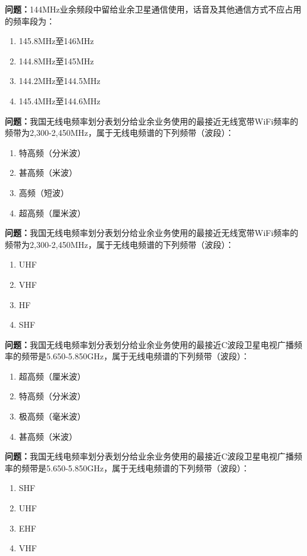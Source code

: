 \bigskip


\noindent\textbf{问题：}144MHz业余频段中留给业余卫星通信使用，话音及其他通信方式不应占用的频率段为：
\begin{enumerate}[label=\Alph*), leftmargin=3em]
\item 145.8MHz至146MHz
\item 144.8MHz至145MHz
\item 144.2MHz至144.5MHz
\item 145.4MHz至144.6MHz
\end{enumerate}

\bigskip


\noindent\textbf{问题：}我国无线电频率划分表划分给业余业务使用的最接近无线宽带WiFi频率的频带为2,300-2,450MHz，属于无线电频谱的下列频带（波段）：
\begin{enumerate}[label=\Alph*), leftmargin=3em]
\item 特高频（分米波）
\item 甚高频（米波）
\item 高频（短波）
\item 超高频（厘米波）
\end{enumerate}

\bigskip


\noindent\textbf{问题：}我国无线电频率划分表划分给业余业务使用的最接近无线宽带WiFi频率的频带为2,300-2,450MHz，属于无线电频谱的下列频带（波段）：
\begin{enumerate}[label=\Alph*), leftmargin=3em]
\item UHF
\item VHF
\item HF
\item SHF
\end{enumerate}

\bigskip


\noindent\textbf{问题：}我国无线电频率划分表划分给业余业务使用的最接近C波段卫星电视广播频率的频带是5.650-5.850GHz，属于无线电频谱的下列频带（波段）：
\begin{enumerate}[label=\Alph*), leftmargin=3em]
\item 超高频（厘米波）
\item 特高频（分米波）
\item 极高频（毫米波）
\item 甚高频（米波）
\end{enumerate}

\bigskip


\noindent\textbf{问题：}我国无线电频率划分表划分给业余业务使用的最接近C波段卫星电视广播频率的频带是5.650-5.850GHz，属于无线电频谱的下列频带（波段）：
\begin{enumerate}[label=\Alph*), leftmargin=3em]
\item SHF
\item UHF
\item EHF
\item VHF
\end{enumerate}

